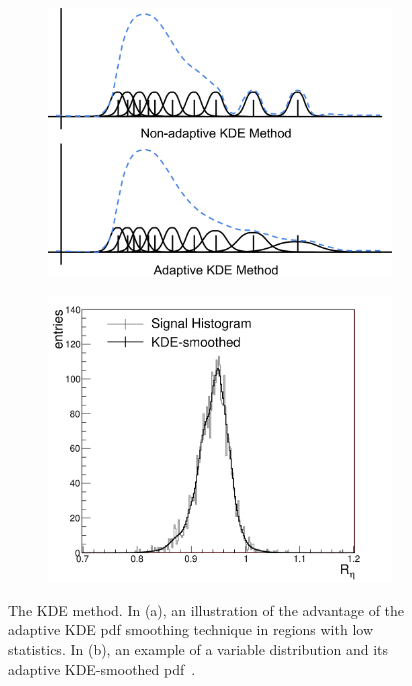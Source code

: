 \begin{figure}[h]
\centering
    \begin{subfigure}[b]{0.49\textwidth}
      \centering
      \includegraphics[width=.98\textwidth]{figs/egamma/KDEMethod.png}
      \caption{}
      \label{fig:egamma:AKDE}
    \end{subfigure}
    \hfill
    \begin{subfigure}[b]{0.49\textwidth}
      \centering
      \includegraphics[width=.98\textwidth]{figs/egamma/new_kde_example.png}
      \caption{}
      \label{fig:egamma:KDEexample}
    \end{subfigure}
     \caption[The KDE method. In (a), an illustration of the advantage of the adaptive KDE pdf smoothing technique in regions with low statistics.  In (b), an example of a variable distribution and its adaptive KDE-smoothed pdf]{The KDE method. In (a), an illustration of the advantage of the adaptive KDE pdf smoothing technique in regions with low statistics.  In (b), an example of a variable distribution and its adaptive KDE-smoothed pdf~\cite{Brendlinger:2228644}.}
\label{fig:egamma:KDE}
\end{figure}
